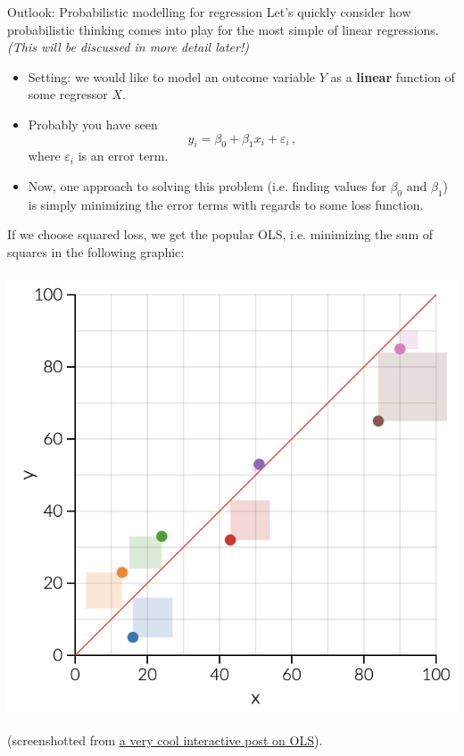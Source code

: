 \documentclass[a4,11pt]{beamer}
\newlength{\wideitemsep}
\let\olditem\item
\renewcommand{\item}{\setlength{\itemsep}{\wideitemsep}\olditem}
\begin{document}
\begin{frame}[allowframebreaks]{Outlook: Probabilistic modelling for regression}
Let's quickly consider how probabilistic thinking comes into play for the most simple of linear regressions. \emph{\small (This will be discussed in more detail later!)}\bigskip\\
\begin{itemize}
	\item Setting: we would like to model an outcome variable $Y$ as a \textbf{linear} function of some regressor $X$.
	\item Probably you have seen \begin{equation*}
		y_i=\beta_0+\beta_1x_i+\varepsilon_i\,,
	\end{equation*}
where $\varepsilon_i$ is an error term.\\
	\item Now, one approach to solving this problem (i.e. finding values for $\beta_0$ and $\beta_1$) is simply minimizing the error terms with regards to some loss function.
\end{itemize}
	If we choose squared loss, we get the popular OLS, i.e. minimizing the sum of squares in the following graphic:\begin{center}
		\includegraphics[width=0.4\linewidth]{OLS.png}
	\end{center}
(screenshotted from \href{https://setosa.io/ev/ordinary-least-squares-regression/}{a very cool interactive post on OLS}).


\end{frame}
\end{document}

